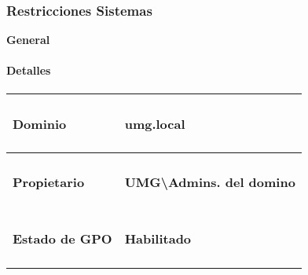 \documentclass[
]{article}
\begin{document}
\hypertarget{restricciones-sistemas}{%
\subsubsection{Restricciones Sistemas}\label{restricciones-sistemas}}

\textbf{General}

\hypertarget{detalles-3}{%
\paragraph{Detalles}\label{detalles-3}}

\begin{longtable}[]{@{}ll@{}}
\toprule
\begin{minipage}[b]{0.47\columnwidth}\raggedright
\hypertarget{dominio-3}{%
\paragraph{Dominio}\label{dominio-3}}\strut
\end{minipage} & \begin{minipage}[b]{0.47\columnwidth}\raggedright
\hypertarget{umg.local-3}{%
\paragraph{umg.local}\label{umg.local-3}}\strut
\end{minipage}\tabularnewline
\midrule
\endhead
\begin{minipage}[t]{0.47\columnwidth}\raggedright
\hypertarget{propietario-3}{%
\paragraph{Propietario}\label{propietario-3}}\strut
\end{minipage} & \begin{minipage}[t]{0.47\columnwidth}\raggedright
\hypertarget{umgadmins.-del-domino-2}{%
\paragraph{UMG\textbackslash Admins. del
domino}\label{umgadmins.-del-domino-2}}\strut
\end{minipage}\tabularnewline
\begin{minipage}[t]{0.47\columnwidth}\raggedright
\hypertarget{estado-de-gpo-3}{%
\paragraph{Estado de GPO}\label{estado-de-gpo-3}}\strut
\end{minipage} & \begin{minipage}[t]{0.47\columnwidth}\raggedright
\hypertarget{habilitado-4}{%
\paragraph{Habilitado}\label{habilitado-4}}\strut
\end{minipage}\tabularnewline
\bottomrule
\end{longtable}
\end{document}
